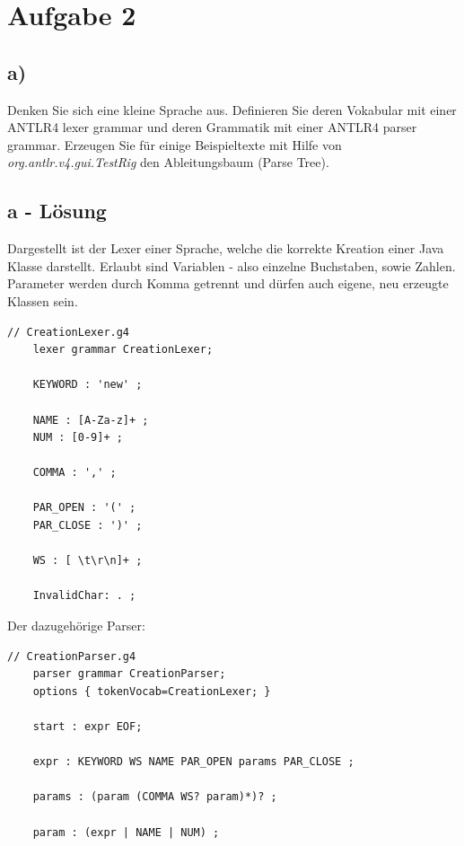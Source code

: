 \section*{Aufgabe 2}
\subsection*{a)}
Denken Sie sich eine kleine Sprache aus.
Definieren Sie deren Vokabular mit einer ANTLR4 lexer grammar und deren Grammatik mit einer ANTLR4 parser grammar.
Erzeugen Sie für einige Beispieltexte mit Hilfe von \textit{org.antlr.v4.gui.TestRig} den Ableitungsbaum (Parse Tree).

\subsection*{a - Lösung}
Dargestellt ist der Lexer einer Sprache, welche die korrekte Kreation einer Java Klasse darstellt.
Erlaubt sind Variablen - also einzelne Buchstaben, sowie Zahlen.
Parameter werden durch Komma getrennt und dürfen auch eigene, neu erzeugte Klassen sein.
\newline
\begin{lstlisting}[label={lst:Aufgabe2a_lexer}, style=ANTLR]
    // CreationLexer.g4
    lexer grammar CreationLexer;

    KEYWORD : 'new' ;

    NAME : [A-Za-z]+ ;
    NUM : [0-9]+ ;

    COMMA : ',' ;

    PAR_OPEN : '(' ;
    PAR_CLOSE : ')' ;

    WS : [ \t\r\n]+ ;

    InvalidChar: . ;
\end{lstlisting}

\newpage

Der dazugehörige Parser:
\begin{lstlisting}[label={lst:Aufgabe2a_parser}, style=ANTLR]
    // CreationParser.g4
    parser grammar CreationParser;
    options { tokenVocab=CreationLexer; }

    start : expr EOF;

    expr : KEYWORD WS NAME PAR_OPEN params PAR_CLOSE ;

    params : (param (COMMA WS? param)*)? ;

    param : (expr | NAME | NUM) ;
\end{lstlisting}
\newline

